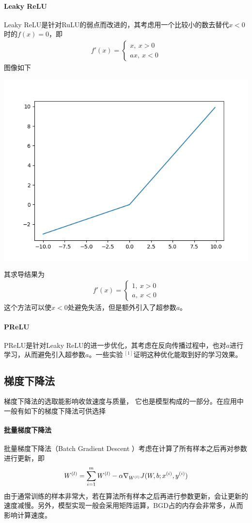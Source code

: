 \paragraph{Leaky ReLU}
Leaky ReLU是针对RuLU的弱点而改进的，其考虑用一个比较小的数去替代$x<0$时的$f(x)=0$，即
\begin{eqnarray}
f'(x)=
\left\lbrace
\begin{aligned}
x,\ x>0\\
ax,\ x<0
\end{aligned}
\right.
\end{eqnarray}
图像如下
\begin{center}
\includegraphics[scale=0.5]{../figures/NN7.png} 
\end{center}
其求导结果为
\begin{eqnarray}
f'(x)=
\left\lbrace
\begin{aligned}
1,\ x>0\\
a,\ x<0
\end{aligned}
\right.
\end{eqnarray}
这个方法可以使$x<0$处避免失活，但是额外引入了超参数$a$。
\paragraph{PReLU}PReLU是针对Leaky ReLU的进一步优化，其考虑在反向传播过程中，也对$a$进行学习，从而避免引入超参数$a$。一些实验$\ ^{[1]}$证明这种优化能取到好的学习效果。
\subsection{梯度下降法}
梯度下降法的选取能影响收敛速度与质量，	它也是模型构成的一部分。在应用中一般有如下的梯度下降法可供选择
\paragraph{批量梯度下降法}
批量梯度下降法（Batch Gradient Descent ）考虑在计算了所有样本之后再对参数进行更新，即
\begin{eqnarray}
{W}^{({l})}=\sum_{i=1}^m{W}^{({l})}-\alpha\nabla_{{W}^{({l})}}J(W,b;{x}^{({i})},{y}^{({i})})
\end{eqnarray} 
由于通常训练的样本非常大，若在算法所有样本之后再进行参数更新，会让更新的速度减慢。另外，模型实现一般会采用矩阵运算，BGD占的内存会非常多，从而影响计算速度。
